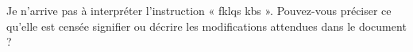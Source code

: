 Je n’arrive pas à interpréter l’instruction « fklqs kbs ».  
Pouvez-vous préciser ce qu’elle est censée signifier ou décrire les modifications attendues dans le document ?